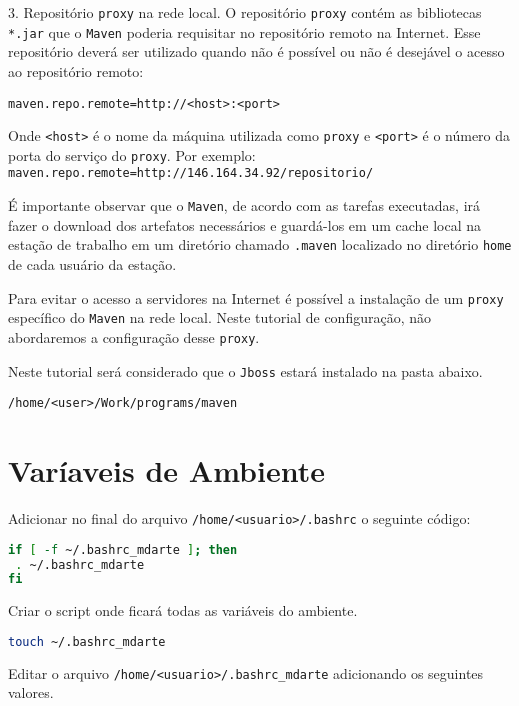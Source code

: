 3. Repositório \texttt{proxy} na rede local. O repositório \texttt{proxy} contém
as bibliotecas \texttt{*.jar} que o \texttt{Maven} poderia requisitar no
repositório remoto na Internet. Esse repositório deverá ser utilizado quando não
é possível ou não é desejável o acesso ao repositório remoto:

\begin{verbatim}
maven.repo.remote=http://<host>:<port> 
\end{verbatim}

Onde \texttt{<host>} é o nome da máquina utilizada como \texttt{proxy} e
\texttt{<port>} é o número da porta do serviço do \texttt{proxy}. Por exemplo:
\texttt{maven.repo.remote=http://146.164.34.92/repositorio/}

É importante observar que o \texttt{Maven}, de acordo com as tarefas executadas,
irá fazer o download dos artefatos necessários e guardá-los em um cache local na
estação de trabalho em um diretório chamado \texttt{.maven} localizado no
diretório \texttt{home} de cada usuário da estação.

Para evitar o acesso a servidores na Internet é possível a instalação de um
\texttt{proxy} específico do \texttt{Maven} na rede local. Neste tutorial de
configuração, não abordaremos a configuração desse \texttt{proxy}.

Neste tutorial será considerado que o \texttt{Jboss} estará instalado na pasta abaixo.

\begin{verbatim}
/home/<user>/Work/programs/maven
\end{verbatim}

\section{Varíaveis de Ambiente}

Adicionar no final do arquivo \texttt{/home/<usuario>/.bashrc} o seguinte código: 

\begin{lstlisting}[language=bash]
if [ -f ~/.bashrc_mdarte ]; then
 . ~/.bashrc_mdarte
fi
\end{lstlisting}

Criar o script onde ficará todas as variáveis do ambiente. 

\begin{lstlisting}[language=bash]
touch ~/.bashrc_mdarte
\end{lstlisting}
	
Editar o arquivo \texttt{/home/<usuario>/.bashrc\_mdarte} adicionando os
seguintes valores.

